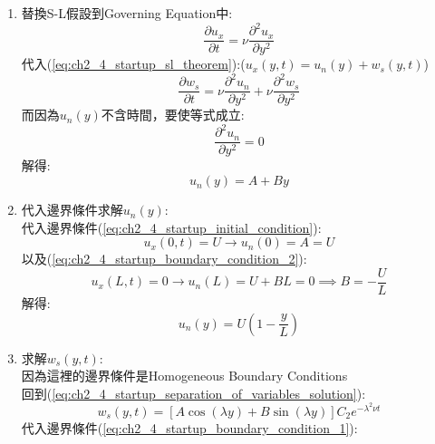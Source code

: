 \documentclass[../main.tex]{subfiles}
\begin{document}
\begin{itemize}
\begin{enumerate}
\begin{align}
        \text{週期性邊界值}\quad & P(a) = P(b) \text{and} P'(a) = P'(b)
      \end{align}
      剩下的Boundary condition，如果只有剩下單一變數的話，例如$u(0,t)$\\
      就可以使用S-L Theorem來解決
    \item 替換S-L假設到Governing Equation中:
      \begin{equation}
        \frac{\partial u_x}{\partial t} = \nu \frac{\partial^2 u_x}{\partial y^2}
      \end{equation}
      代入(\ref{eq:ch2_4_startup_sl_theorem}):($u_x(y,t)=u_n(y)+w_s(y,t)$)
      \begin{equation}
        \frac{\partial w_s}{\partial t} = \nu \frac{\partial^2 u_n}{\partial y^2} + \nu \frac{\partial^2 w_s}{\partial y^2}
      \end{equation}
      而因為$u_n(y)$不含時間，要使等式成立:
      \begin{equation}
        \frac{\partial^2 u_n}{\partial y^2} = 0
      \end{equation}
      解得:
      \begin{equation}
        u_n(y) = A + By
      \end{equation}
    \item 代入邊界條件求解$u_n(y)$:\\
      代入邊界條件(\ref{eq:ch2_4_startup_initial_condition}):
      \begin{equation}
        u_x(0,t) = U \to u_n(0) = A = U
      \end{equation}
      以及(\ref{eq:ch2_4_startup_boundary_condition_2}):
      \begin{equation}
        u_x(L,t) = 0 \to 
        u_n(L) = U + B L = 0 \implies B = -\frac{U}{L}
      \end{equation}
      解得:
      \begin{equation}
        \boxed{u_n(y) = U \left(1 - \frac{y}{L} \right)}
      \end{equation}
      \item 求解$w_s(y,t)$:\\
      因為這裡的邊界條件是Homogeneous Boundary Conditions\\
      回到(\ref{eq:ch2_4_startup_separation_of_variables_solution}):
      \begin{equation}
        w_s(y,t) = \left[
          A \cos(\lambda y) + B \sin(\lambda y)
        \right] C_2 e^{-\lambda^2 \nu t}
      \end{equation}
      代入邊界條件(\ref{eq:ch2_4_startup_boundary_condition_1}):

\end{enumerate}
\end{itemize}
\end{document}
